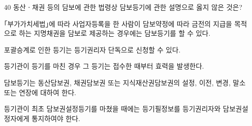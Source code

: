 \begin{question}{40}
동산ㆍ채권 등의 담보에 관한 법령상 담보등기에 관한 설명으로 옳지 않은 것은?
\begin{choices}
  \item ｢부가가치세법｣에 따라 사업자등록을 한 사람이 담보약정에 따라 금전의 지급을 목적으로 하는 지명채권을 담보로 제공하는 경우에는 담보등기를 할 수 있다.
  \item 포괄승계로 인한 등기는 등기권리자 단독으로 신청할 수 있다.
  \item 등기관이 등기를 마친 경우 그 등기는 접수한 때부터 효력을 발생한다.
  \item 담보등기는 동산담보권, 채권담보권 또는 지식재산권담보권의 설정, 이전, 변경, 말소 또는 연장에 대하여 한다.
  \item 등기관이 최초 담보권설정등기를 마쳤을 때에는 등기필정보를 등기권리자와 담보권설정자에게 통지하여야 한다.
\end{choices}
\end{question}
